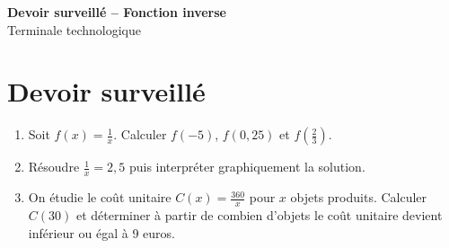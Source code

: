\documentclass[french,11pt]{book}
\begin{document}
\begin{center}
{\Large \textbf{Devoir surveillé -- Fonction inverse}}\\[2mm]
Terminale technologique
\end{center}

\section*{Devoir surveillé}
\begin{enumerate}
  \item Soit $f(x)=\frac{1}{x}$. Calculer $f(-5)$, $f(0,25)$ et $f\left(\frac{2}{3}\right)$.
  \item Résoudre $\frac{1}{x}=2,5$ puis interpréter graphiquement la solution.
  \item On étudie le coût unitaire $C(x)=\frac{360}{x}$ pour $x$ objets produits. Calculer $C(30)$ et déterminer à partir de combien d'objets le coût unitaire devient inférieur ou égal à 9 euros.
\end{enumerate}
\end{document}
